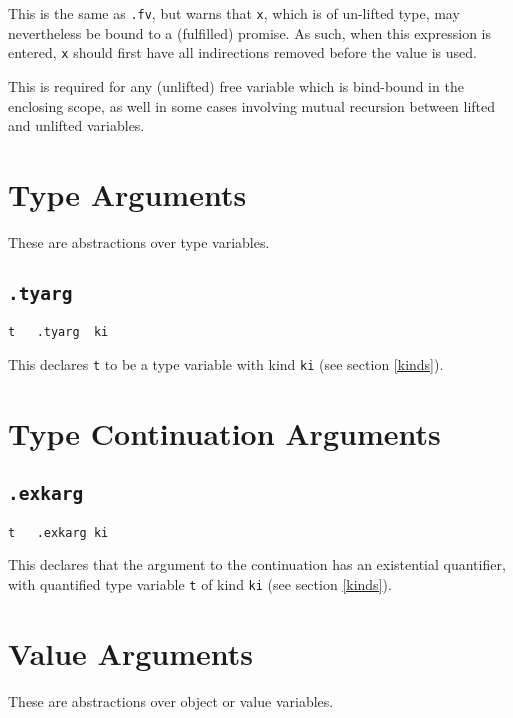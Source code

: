 \documentclass{report}
\newcommand\stringcode[1]{\texttt{#1}}
\begin{document}
This is the same as \stringcode{.fv}, but warns that \stringcode{x}, which is of un-lifted type, may nevertheless be bound to a (fulfilled) promise.
As such, when this expression is entered, \stringcode{x} should first have all indirections removed before the value is used.

This is required for any (unlifted) free variable which is bind-bound in the enclosing scope,
as well in some cases involving mutual recursion between lifted and unlifted variables.

\section{Type Arguments}
\label{code_type_arg}

These are abstractions over type variables.

\subsection{\stringcode{.tyarg}}

\begin{verbatim}
t	.tyarg	ki
\end{verbatim}

This declares \stringcode{t} to be a type variable with kind \stringcode{ki}  (see section \ref{kinds}).

\section{Type Continuation Arguments}
\label{cont_type_arg}

\subsection{\stringcode{.exkarg}}

\begin{verbatim}
t	.exkarg	ki
\end{verbatim}

This declares that the argument to the continuation has an existential quantifier,
with quantified type variable \stringcode{t} of kind \stringcode{ki}  (see section \ref{kinds}).

\section{Value Arguments}
\label{value_arg}

These are abstractions over object or value variables.
\end{document}
